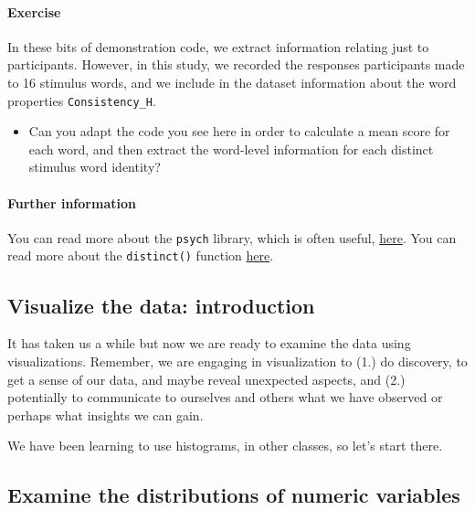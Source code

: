\documentclass[
  letterpaper,
  DIV=11,
  numbers=noendperiod]{scrreprt}
\let\oldparagraph\paragraph
\renewcommand{\paragraph}[1]{\oldparagraph{#1}\mbox{}}
\providecommand{\tightlist}{%
  \setlength{\itemsep}{0pt}\setlength{\parskip}{0pt}}\usepackage{longtable,booktabs,array}
\begin{document}
\hypertarget{exercise}{%
\paragraph{Exercise}\label{exercise}}

In these bits of demonstration code, we extract information relating
just to participants. However, in this study, we recorded the responses
participants made to 16 stimulus words, and we include in the dataset
information about the word properties \texttt{Consistency\_H}.

\begin{itemize}
\tightlist
\item
  Can you adapt the code you see here in order to calculate a mean score
  for each word, and then extract the word-level information for each
  distinct stimulus word identity?
\end{itemize}

\hypertarget{further-information-1}{%
\paragraph{Further information}\label{further-information-1}}

You can read more about the \texttt{psych} library, which is often
useful,
\href{https://personality-project.org/r/psych/vignettes/intro.pdf}{here}.
You can read more about the \texttt{distinct()} function
\href{https://dplyr.tidyverse.org/reference/distinct.html}{here}.

\hypertarget{visualize-data}{%
\subsection{Visualize the data: introduction}\label{visualize-data}}

It has taken us a while but now we are ready to examine the data using
visualizations. Remember, we are engaging in visualization to (1.) do
discovery, to get a sense of our data, and maybe reveal unexpected
aspects, and (2.) potentially to communicate to ourselves and others
what we have observed or perhaps what insights we can gain.

We have been learning to use histograms, in other classes, so let's
start there.

\hypertarget{sec-examine-distribution}{%
\subsection{Examine the distributions of numeric
variables}\label{sec-examine-distribution}}
\end{document}
